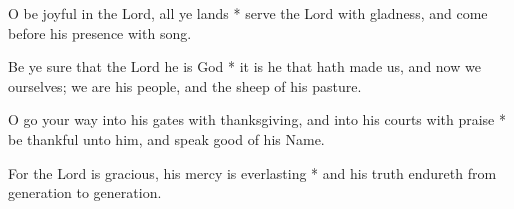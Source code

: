 O be joyful in the Lord, all ye lands * serve the Lord with gladness, and come before his presence with song.

Be ye sure that the Lord he is God * it is he that hath made us, and now we ourselves; we are his people, and the sheep of his pasture.

O go your way into his gates with thanksgiving, and into his courts with praise * be thankful unto him, and speak good of his Name.

For the Lord is gracious, his mercy is everlasting * and his truth endureth from generation to generation.
